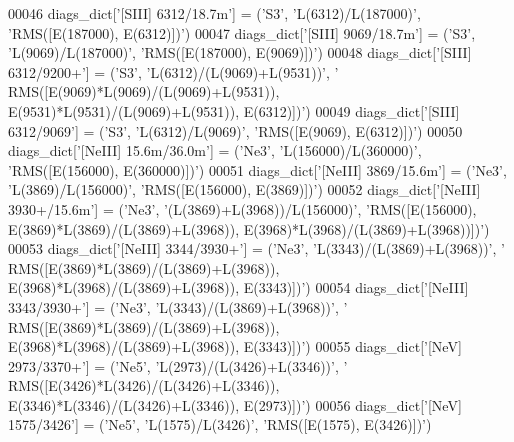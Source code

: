 \begin{DoxyCode}
00046 diags\_dict[\textcolor{stringliteral}{'[SIII] 6312/18.7m'}] = (\textcolor{stringliteral}{'S3'}, \textcolor{stringliteral}{'L(6312)/L(187000)'}, \textcolor{stringliteral}{'RMS([E(187000), E(6312)])'})
00047 diags\_dict[\textcolor{stringliteral}{'[SIII] 9069/18.7m'}] = (\textcolor{stringliteral}{'S3'}, \textcolor{stringliteral}{'L(9069)/L(187000)'}, \textcolor{stringliteral}{'RMS([E(187000), E(9069)])'})
00048 diags\_dict[\textcolor{stringliteral}{'[SIII] 6312/9200+'}] = (\textcolor{stringliteral}{'S3'}, \textcolor{stringliteral}{'L(6312)/(L(9069)+L(9531))'}, \textcolor{stringliteral}{'
      RMS([E(9069)*L(9069)/(L(9069)+L(9531)), E(9531)*L(9531)/(L(9069)+L(9531)), E(6312)])'})
00049 diags\_dict[\textcolor{stringliteral}{'[SIII] 6312/9069'}] = (\textcolor{stringliteral}{'S3'}, \textcolor{stringliteral}{'L(6312)/L(9069)'}, \textcolor{stringliteral}{'RMS([E(9069), E(6312)])'})
00050 diags\_dict[\textcolor{stringliteral}{'[NeIII] 15.6m/36.0m'}] = (\textcolor{stringliteral}{'Ne3'}, \textcolor{stringliteral}{'L(156000)/L(360000)'}, \textcolor{stringliteral}{'RMS([E(156000), E(360000)])'})
00051 diags\_dict[\textcolor{stringliteral}{'[NeIII] 3869/15.6m'}] = (\textcolor{stringliteral}{'Ne3'}, \textcolor{stringliteral}{'L(3869)/L(156000)'}, \textcolor{stringliteral}{'RMS([E(156000), E(3869)])'})
00052 diags\_dict[\textcolor{stringliteral}{'[NeIII] 3930+/15.6m'}] = (\textcolor{stringliteral}{'Ne3'}, \textcolor{stringliteral}{'(L(3869)+L(3968))/L(156000)'}, \textcolor{stringliteral}{'RMS([E(156000),
       E(3869)*L(3869)/(L(3869)+L(3968)), E(3968)*L(3968)/(L(3869)+L(3968))])'})
00053 diags\_dict[\textcolor{stringliteral}{'[NeIII] 3344/3930+'}] = (\textcolor{stringliteral}{'Ne3'}, \textcolor{stringliteral}{'L(3343)/(L(3869)+L(3968))'}, \textcolor{stringliteral}{'
      RMS([E(3869)*L(3869)/(L(3869)+L(3968)), E(3968)*L(3968)/(L(3869)+L(3968)), E(3343)])'})
00054 diags\_dict[\textcolor{stringliteral}{'[NeIII] 3343/3930+'}] = (\textcolor{stringliteral}{'Ne3'}, \textcolor{stringliteral}{'L(3343)/(L(3869)+L(3968))'}, \textcolor{stringliteral}{'
      RMS([E(3869)*L(3869)/(L(3869)+L(3968)), E(3968)*L(3968)/(L(3869)+L(3968)), E(3343)])'})
00055 diags\_dict[\textcolor{stringliteral}{'[NeV] 2973/3370+'}] = (\textcolor{stringliteral}{'Ne5'}, \textcolor{stringliteral}{'L(2973)/(L(3426)+L(3346))'}, \textcolor{stringliteral}{'
      RMS([E(3426)*L(3426)/(L(3426)+L(3346)), E(3346)*L(3346)/(L(3426)+L(3346)), E(2973)])'})
00056 diags\_dict[\textcolor{stringliteral}{'[NeV] 1575/3426'}] = (\textcolor{stringliteral}{'Ne5'}, \textcolor{stringliteral}{'L(1575)/L(3426)'}, \textcolor{stringliteral}{'RMS([E(1575), E(3426)])'})

\end{DoxyCode}
